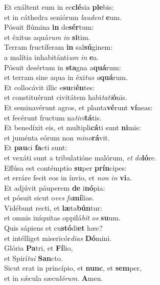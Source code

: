 \evenverse Et exáltent eum in ec\textbf{clé}sia \textbf{ple}bis:~\*\\
\evenverse et in cáthedra seniórum \textit{lau}\textit{dent} \textbf{e}um.\\
\oddverse Pósuit flúmina \textbf{in} de\textbf{sér}tum:~\*\\
\oddverse et éxitus aquá\textit{rum} \textit{in} \textbf{si}tim.\\
\evenverse Terram fructíferam \textbf{in} sal\textbf{sú}ginem:~\*\\
\evenverse a malítia inhabitánti\textit{um} \textit{in} \textbf{e}a.\\
\oddverse Pósuit desértum in \textbf{sta}gna a\textbf{quá}rum:~\*\\
\oddverse et terram sine aqua in éxi\textit{tus} \textit{a}\textbf{quá}rum.\\
\evenverse Et collocávit illic e\textbf{su}ri\textbf{én}tes:~\*\\
\evenverse et constituérunt civitátem habi\textit{ta}\textit{ti}\textbf{ó}nis.\\
\oddverse Et seminavérunt agros, et planta\textbf{vé}runt \textbf{ví}neas:~\*\\
\oddverse et fecérunt fructum na\textit{ti}\textit{vi}\textbf{tá}tis.\\
\evenverse Et benedíxit eis, et multipli\textbf{cá}ti sunt \textbf{ni}mis:~\*\\
\evenverse et juménta eórum non \textit{mi}\textit{no}\textbf{rá}vit.\\
\oddverse Et \textbf{pau}ci \textbf{fa}cti sunt:~\*\\
\oddverse et vexáti sunt a tribulatióne malórum, \textit{et} \textit{do}\textbf{ló}re.\\
\evenverse Effúsa est contémptio \textbf{su}per \textbf{prín}cipes:~\*\\
\evenverse et erráre fecit eos in ínvio, et \textit{non} \textit{in} \textbf{vi}a.\\
\oddverse Et adjúvit páuperem \textbf{de} i\textbf{nó}pia:~\*\\
\oddverse et pósuit sicut o\textit{ves} \textit{fa}\textbf{mí}lias.\\
\evenverse Vidébunt recti, et \textbf{læ}ta\textbf{bún}tur:~\*\\
\evenverse et omnis iníquitas oppilá\textit{bit} \textit{os} \textbf{su}um.\\
\oddverse Quis sápiens et cu\textbf{stó}di\textbf{et} hæc?~\*\\
\oddverse et intélliget misericór\textit{di}\textit{as} \textbf{Dó}mini.\\
\evenverse Glória \textbf{Pa}tri, et \textbf{Fí}lio,~\*\\
\evenverse et Spirí\textit{tu}\textit{i} \textbf{San}cto.\\
\oddverse Sicut erat in princípio, et \textbf{nunc}, et \textbf{sem}per,~\*\\
\oddverse et in sǽcula sæcu\textit{ló}\textit{rum}. \textbf{A}men.\\
